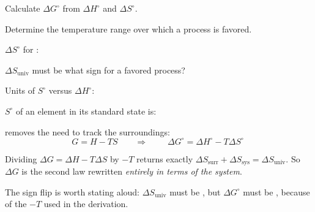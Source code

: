 \documentclass{apchem-notes}
\begin{document}

\begin{objectives}
  \item Calculate $\Delta G^\circ$ from $\Delta H^\circ$ and
        $\Delta S^\circ$.
  \item Determine the temperature range over which a process is favored.
\end{objectives}


\begin{warmup}[4]
  \item $\Delta S^\circ$ for :
  \item $\Delta S_{\text{univ}}$ must be what sign for a favored process?
  \item Units of $S^\circ$ versus $\Delta H^\circ$:
  \item $S^\circ$ of an element in its standard state is:
\end{warmup}



 removes the need to track the surroundings:
\[ G = H - TS \qquad\Longrightarrow\qquad
   \boxed{\;\Delta G^\circ = \Delta H^\circ - T\Delta S^\circ\;} \]

Dividing $\Delta G = \Delta H - T\Delta S$ by $-T$ returns exactly
$\Delta S_{\text{surr}} + \Delta S_{\text{sys}} = \Delta S_{\text{univ}}$.
So $\Delta G$ is the second law rewritten \emph{entirely in terms of the
system}.

\begin{center}
\end{center}

The sign flip is worth stating aloud: $\Delta S_{\text{univ}}$ must be
, but $\Delta G^\circ$ must be
, because of the $-T$ used in the derivation.
\end{document}

